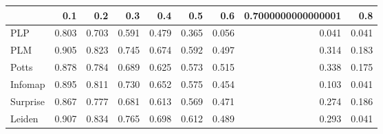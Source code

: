\begin{tabular}{lrrrrrrrr}
\toprule
{} &   0.1 &   0.2 &   0.3 &   0.4 &   0.5 &   0.6 & 0.7000000000000001 &   0.8 \\
\midrule
PLP      & 0.803 & 0.703 & 0.591 & 0.479 & 0.365 & 0.056 &              0.041 & 0.041 \\
PLM      & 0.905 & 0.823 & 0.745 & 0.674 & 0.592 & 0.497 &              0.314 & 0.183 \\
Potts    & 0.878 & 0.784 & 0.689 & 0.625 & 0.573 & 0.515 &              0.338 & 0.175 \\
Infomap  & 0.895 & 0.811 & 0.730 & 0.652 & 0.575 & 0.454 &              0.103 & 0.041 \\
Surprise & 0.867 & 0.777 & 0.681 & 0.613 & 0.569 & 0.471 &              0.274 & 0.186 \\
Leiden   & 0.907 & 0.834 & 0.765 & 0.698 & 0.612 & 0.489 &              0.293 & 0.041 \\
\bottomrule
\end{tabular}
